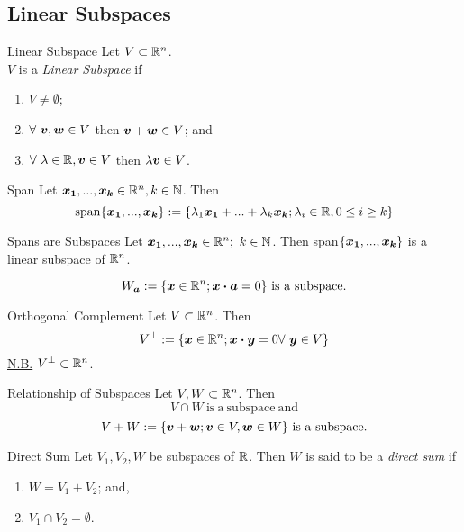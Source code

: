 \documentclass[11pt,a4paper]{article}
\begin{document}
\subsection{Linear Subspaces}

\subtitle{Definition 2.11 - }{Linear Subspace}
Let $V \subset \mathbb{R}^n$.\\
$V$ is a \textit{Linear Subspace} if
\begin{enumerate}[label=\roman*)]
  \item $V \not = \emptyset$;
  \item $\forall\ \boldsymbol{v}, \boldsymbol{w} \in V$ then $\boldsymbol{v} + \boldsymbol{w} \in V$; and
  \item $\forall\ \lambda \in \mathbb{R}, \boldsymbol{v} \in V$ then $\lambda\boldsymbol{v} \in V$.\\
\end{enumerate}

\subtitle{Definition 2.12 - }{Span}
Let $\boldsymbol{x_1}, ... , \boldsymbol{x_k} \in \mathbb{R}^n, k \in \mathbb{N}$. Then
$$\mathrm{span}\{\boldsymbol{x_1}, ... , \boldsymbol{x_k}\} := \{\lambda_1\boldsymbol{x_1} + ... + \lambda_k\boldsymbol{x_k}; \lambda_i \in \mathbb{R}, 0 \leq i \geq k\}$$

\subtitle{Theorem 2.13 - }{Spans are Subspaces}
Let $\boldsymbol{x_1}, ... , \boldsymbol{x_k} \in \mathbb{R}^n;\ k \in \mathbb{N}$. Then span$\{\boldsymbol{x_1}, ... , \boldsymbol{x_k}\}$ is a linear subspace of $\mathbb{R}^n$. \\

\subtitle{Theorem 2.14}{}
$$W_{\boldsymbol{a}} := \{\boldsymbol{x} \in \mathbb{R}^n; \boldsymbol{x} \boldsymbol{\cdot} \boldsymbol{a} = 0\}\mathrm{\ is\ a\ subspace.}$$

\subtitle{Definition 2.15 - }{Orthogonal Complement}
Let $V \subset \mathbb{R}^n$. Then
$$V^{\perp} := \{\boldsymbol{x} \in \mathbb{R}^n; \boldsymbol{x} \boldsymbol{\cdot} \boldsymbol{y} = 0 \forall\ \boldsymbol{y} \in V\}$$
\underline{N.B.} $V^{\perp} \subset \mathbb{R}^n$.\\

\subtitle{Theorem 2.16 - }{Relationship of Subspaces}
Let $V, W \subset \mathbb{R}^n$. Then
$$V \cap W \mathrm{\ is\ a\ subspace\ and}$$
$$V+W := \{\boldsymbol{v} + \boldsymbol{w}; \boldsymbol{v} \in V, \boldsymbol{w} \in W\}\mathrm{\ is\ a\ subspace.}$$

\subtitle{Definition 2.17 - }{Direct Sum}
Let $V_1, V_2, W$ be subspaces of $\mathbb{R}$. Then $W$ is said to be a \textit{direct sum} if
\begin{enumerate}[label=\roman*)]
  \item $W = V_1 + V_2$; and,
  \item $V_1 \cap V_2 = \emptyset$.
\end{enumerate}
\end{document}
